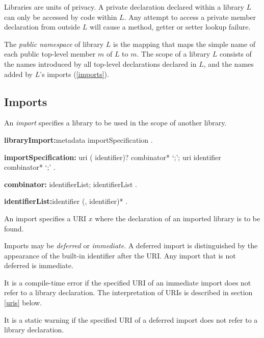\documentclass{article}
\begin{document}
\LMHash{}
Libraries are units of privacy.
A private declaration declared within a library $L$ can only be accessed by code within $L$.
Any attempt to access a private member declaration from outside $L$ will cause a method, getter or setter lookup failure.


\LMHash{}
The {\em public namespace} of library $L$ is the mapping that maps the simple name of each public top-level member $m$ of $L$ to $m$.
The scope of a library $L$ consists of the names introduced by all top-level declarations declared in $L$, and the names added by $L$'s imports (\ref{imports}).


\subsection{Imports}

\LMHash{}
An {\em import} specifies a library to be used in the scope of another library.
\begin{grammar}
{\bf libraryImport:}metadata importSpecification
  .

{\bf importSpecification:}\IMPORT{} uri (\AS{} identifier)? combinator* `{\escapegrammar ;}';
  \IMPORT{} uri \DEFERRED{} \AS{} identifier combinator* `{\escapegrammar ;}'
  .

{\bf combinator:}\SHOW{} identifierList;
  \HIDE{} identifierList
  .

{\bf identifierList:}identifier (, identifier)*
  .
\end{grammar}

\LMHash{}
An import specifies a URI $x$ where the declaration of an imported library is to be found.

\LMHash{}
Imports may be {\em deferred} or {\em immediate}.
A deferred import is distinguished by the appearance of the built-in identifier \DEFERRED{} after the URI.
Any import that is not deferred is immediate.

\LMHash{}
It is a compile-time error if the specified URI of an immediate import does not refer to a library declaration.
The interpretation of URIs is described in section \ref{uris} below.

\LMHash{}
It is a static warning if the specified URI of a deferred import does not refer to a library declaration.

\end{document}
